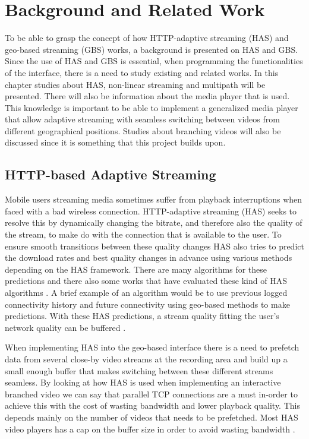\chapter{Background and Related Work}
\label{cha:theory}

To be able to grasp the concept of how HTTP-adaptive streaming (HAS) and geo-based streaming (GBS) works, a background is presented on HAS and GBS. Since the use of HAS and GBS is essential, when programming the functionalities of the interface, there is a need to study existing and related works. In this chapter studies about HAS, non-linear streaming and multipath will be presented. There will also be information about the media player that is used. This knowledge is important to be able to implement a generalized media player that allow adaptive streaming with seamless switching between videos from different geographical positions. Studies about branching videos will also be discussed since it is something that this project builds upon.

\section{HTTP-based Adaptive Streaming}
\label{sec:has}

Mobile users streaming media sometimes suffer from playback interruptions when faced with a bad wireless connection. HTTP-adaptive streaming (HAS) seeks to resolve this by dynamically changing the bitrate, and therefore also the quality of the stream, to make do with the connection that is available to the user. To ensure smooth transitions between these quality changes HAS also tries to predict the download rates and best quality changes in advance using various methods depending on the HAS framework. There are many algorithms for these predictions and there also some works that have evaluated these kind of HAS algorithms \cite{experimentalevaluation,hastohelp}. A brief example of an algorithm would be to use previous logged connectivity history and future connectivity using geo-based methods to make predictions. With these HAS predictions, a stream quality fitting the user’s network quality can be buffered \cite{gtube}.

When implementing HAS into the geo-based interface there is a need to prefetch data from several close-by video streams at the recording area and build up a small enough buffer that makes switching between these different streams seamless. By looking at how HAS is used when implementing an interactive branched video we can say that parallel TCP connections are a must in-order to achieve this with the cost of wasting bandwidth and lower playback quality. This depends mainly on the number of videos that needs to be prefetched. Most HAS video players has a cap on the buffer size in order to avoid wasting bandwidth \cite{qualbranch}. 

